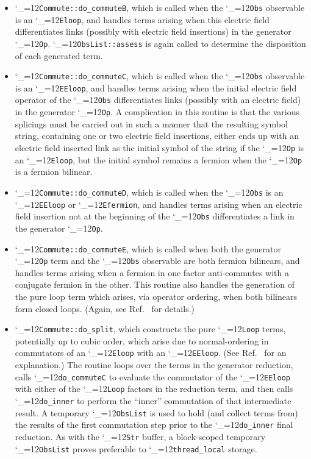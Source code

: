 \documentclass [12pt]{article}
\makeatletter
\renewcommand{\tt}{\begingroup\catcode`_=12\def\_{\string_}\tt@}
\newcommand{\tt@}[1]{\texttt{#1}\endgroup}
\makeatother
\begin{document}
\begin{itemize}
\item
    \tt{Commute::do_commuteB}, which is called when the
    \tt{Obs} observable is an \tt{Eloop}, and handles
    terms arising when this electric field differentiates
    links (possibly with electric field insertions) in the generator \tt{Op}.
    \tt{ObsList::assess} is again called to determine
    the disposition of each generated term.

\item
    \tt{Commute::do_commuteC}, which is called when the
    \tt{Obs} observable is an \tt{EEloop}, and handles
    terms arising when the initial electric field operator of
    the \tt{Obs} differentiates links (possibly with an electric field)
    in the generator \tt{Op}.
    A complication in this routine is that the various splicings
    must be carried out in such a manner that the resulting symbol
    string, containing one or two electric field insertions,
    either ends up with an electric field inserted link as the
    initial symbol of the string if the \tt{Op} is an \tt{Eloop},
    but the initial symbol remains a fermion when the \tt{Op} is
    a fermion bilinear.

\item
    \tt{Commute::do_commuteD}, which is called when the \tt{Obs} is
    an \tt{EEloop} or \tt{Efermion},
    and handles terms arising when an electric field insertion
    not at the beginning of the \tt{Obs} differentiates
    a link in the generator \tt{Op}.

\item
    \tt{Commute::do_commuteE}, which is called when both the generator \tt{Op}
    term and the \tt{Obs} observable are both fermion bilinears, and handles
    terms arising when a fermion in one factor anti-commutes with a
    conjugate fermion in the other.
    This routine also handles the generation of the pure loop
    term which arises, via operator ordering, when both
    bilinears form closed loops.
    (Again, see Ref.~\cite{CSVAII} for details.)

\item
    \tt{Commute::do_split}, which constructs the 
    pure \tt{Loop} terms, potentially up to cubic order,
    which arise due to normal-ordering
    in commutators of an \tt{Eloop} with an \tt{EEloop}.
    (See Ref.~\cite{CSVAII} for an explanation.)
    The routine loops over the terms in the generator reduction,
    calls \tt{do_commuteC} to evaluate the
    commutator of the \tt{EEloop} with either of the \tt{Loop} factors
    in the reduction term,
    and then calls \tt{do_inner} to perform the ``inner'' commutation
    of that intermediate result.
    A temporary \tt{ObsList} is used
    to hold (and collect terms from) the results of the first
    commutation step prior to the \tt{do_inner} final reduction.
    As with the \tt{Str} buffer, a block-scoped temporary
    \tt{ObsList} proves preferable to \tt{thread_local} storage.


\end{itemize}
\end{document}
